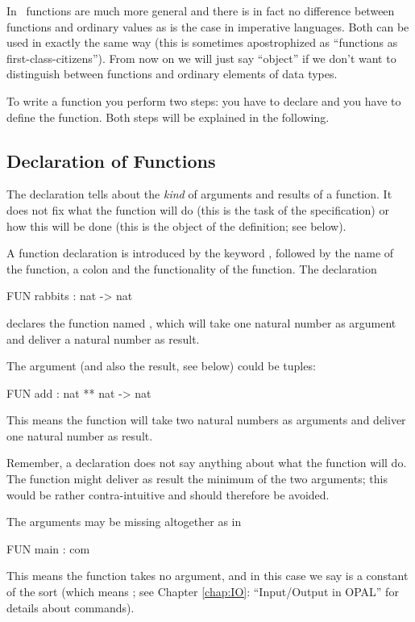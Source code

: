 In \opal\ functions are much more general and there is  in fact no
difference between functions and ordinary values as is the case in
imperative languages.
Both can be used in exactly the same way (this is sometimes
apostrophized as
``functions as first-class-citizens'').
From now on we will just say ``object'' if we don't want to
distinguish between functions and ordinary elements of data types.

\medskip
To write a function you perform two steps: you have to declare and you have
to define the function. 
Both steps will be explained in the following.


\subsection{Declaration of Functions}
\label{sec:fun.decl}
\novice The declaration tells about the {\em kind\/} of arguments and results
of a function.
It does not fix what the function will do (this is the task of the
specification)
or how this will be done (this is the object of the definition; see below).

\medskip
A function declaration is introduced by the keyword ,
followed by the name of the function, a colon and the functionality of
the function. 
 The declaration
\begin{prog}
        FUN rabbits : nat -> nat
\end{prog}
declares the function named , which will take one natural
number as argument and deliver a natural number as result.

The argument (and also the result, see below) could be tuples:
\begin{prog}
        FUN add : nat ** nat -> nat
\end{prog}
This means the function  will take two natural numbers as
arguments and deliver one natural number as result. 

Remember, a declaration does not say  anything about what the
function will do. 
The function  might deliver as  result the minimum of the
two arguments; this would be rather contra-intuitive and should therefore
be avoided.

 The arguments may be missing altogether as in
\begin{prog}
        FUN main : com
\end{prog}
This means the function  takes no argument, and in this case
we say  is a constant of the sort  (which means
; see Chapter \ref{chap:IO}: ``Input/Output in OPAL'' for
details about commands).

